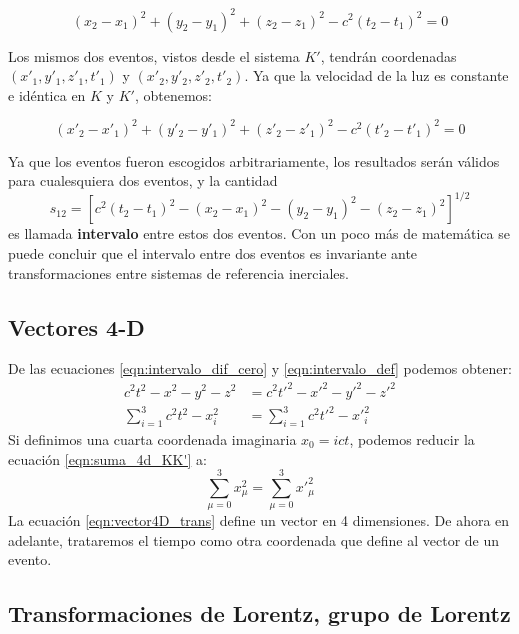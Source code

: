 \documentclass[]{article}
\numberwithin{equation}{section}
\begin{document}
\begin{equation}
	(x_2-x_1)^2+(y_2-y_1)^2+(z_2-z_1)^2 - c^2(t_2-t_1)^2 = 0
\end{equation}

Los mismos dos eventos, vistos desde el sistema $K'$, tendrán coordenadas $(x'_1,y'_1,z'_1,t'_1)$ y $(x'_2,y'_2,z'_2,t'_2)$. Ya que la velocidad de la luz es constante e idéntica en $K$ y $K'$, obtenemos:

\begin{equation}
	(x'_2-x'_1)^2+(y'_2-y'_1)^2+(z'_2-z'_1)^2 - c^2(t'_2-t'_1)^2 = 0
	\label{eqn:intervalo_dif_cero}
\end{equation}

Ya que los eventos fueron escogidos arbitrariamente, los resultados serán válidos para cualesquiera dos eventos, y la cantidad
\begin{equation}
	s_{12} = \left[ c^2(t_2-t_1)^2 - (x_2-x_1)^2 - (y_2-y_1)^2 - (z_2-z_1)^2\right]^{1/2}
	\label{eqn:intervalo_def}
\end{equation}
es llamada \textbf{intervalo} entre estos dos eventos. Con un poco más de matemática se puede concluir que el intervalo entre dos eventos es invariante ante transformaciones entre sistemas de referencia inerciales.

\subsection{Vectores 4-D}
De las ecuaciones \ref{eqn:intervalo_dif_cero} y \ref{eqn:intervalo_def} podemos obtener:
\begin{align}
	c^2t^2 - x^2 - y^2 - z^2 &= c^2t'^2 - x'^2 - y'^2 - z'^2\\
	\sum_{i=1}^{3}c^2t^2 - x^2_i&= \sum_{i=1}^{3} c^2t'^2 - x'^2_i
	\label{eqn:suma_4d_KK'}
\end{align}
Si definimos una cuarta coordenada imaginaria $x_0 = ict$, podemos reducir la ecuación \ref{eqn:suma_4d_KK'} a:
\begin{equation}
	\sum_{\mu=0}^{3}x^2_\mu = \sum_{\mu=0}^{3}x'^2_\mu
	\label{eqn:vector4D_trans}
\end{equation}
La ecuación \ref{eqn:vector4D_trans} define un vector en 4 dimensiones. De ahora en adelante, trataremos el tiempo como otra coordenada que define al vector de un evento.

\subsection{Transformaciones de Lorentz, grupo de Lorentz}
\end{document}
